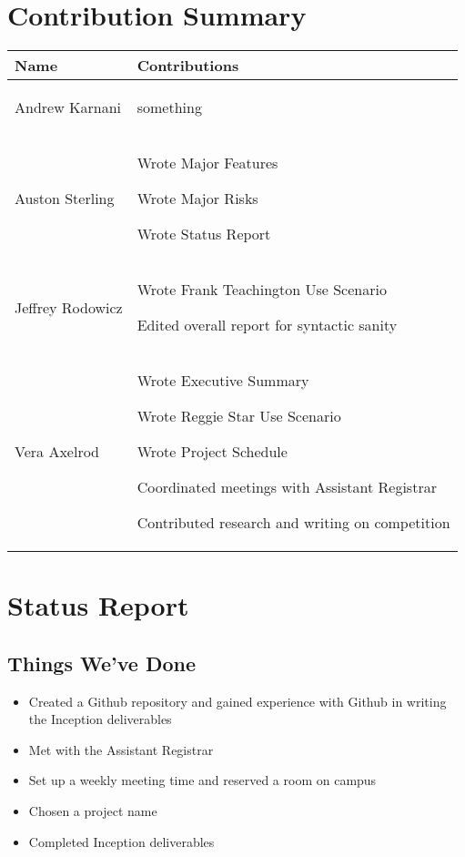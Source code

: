 \documentclass[11pt]{article}
\newenvironment{packed_itemize}{
\begin{itemize}
  \setlength{\itemsep}{1pt}
  \setlength{\parskip}{0pt}
  \setlength{\parsep}{0pt}
}{\end{itemize}}
\begin{document}
\section{Contribution Summary} %
\begin{tabular}{|m{1.4in}|m{4in}|}
\hline
\textbf{\large Name}     & \textbf{\large Contributions} \\
\hline\hline
 Andrew Karnani
	&
	 \begin{packed_itemize}
		\item something
	\end{packed_itemize}
\\
\hline
 Auston Sterling
	&
	 \begin{packed_itemize}
	        \item Wrote Major Features
                \item Wrote Major Risks
                \item Wrote Status Report
	\end{packed_itemize}
\\
\hline
Jeffrey Rodowicz
	&
	 \begin{packed_itemize}
		\item Wrote Frank Teachington Use Scenario
		\item Edited overall report for syntactic sanity
	\end{packed_itemize}
\\
\hline
Vera Axelrod
	&
	 \begin{packed_itemize}
		\item Wrote Executive Summary
		\item Wrote Reggie Star Use Scenario
		\item Wrote Project Schedule
		\item Coordinated meetings with Assistant Registrar
		\item Contributed research and writing on competition
	\end{packed_itemize}
\\
\hline
\end{tabular}


\section{Status Report} %
\subsection{Things We've Done}
\begin{itemize}
\item Created a Github repository and gained experience with Github in writing the Inception deliverables
\item Met with the Assistant Registrar
\item Set up a weekly meeting time and reserved a room on campus
\item Chosen a project name
\item Completed Inception deliverables
\end{itemize}
\end{document}
